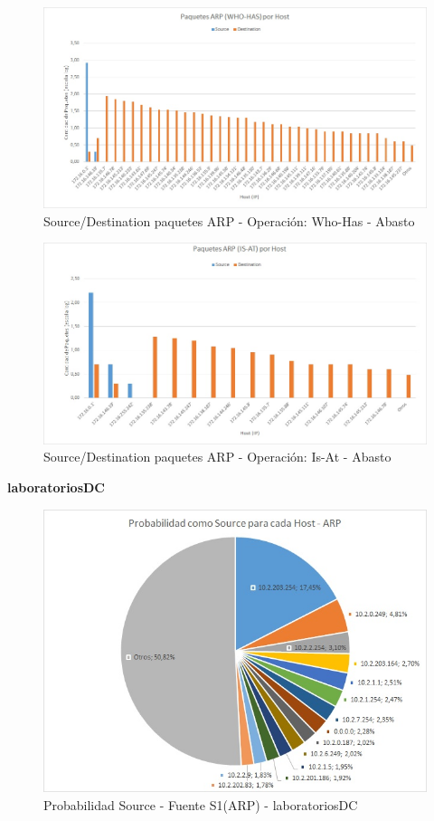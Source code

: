 

\begin{figure}[h!]
\centering
\includegraphics[scale=0.7]{./img/arp_whoHas_abasto.jpg}
\caption{Source/Destination paquetes ARP - Operación: Who-Has - Abasto}
\end{figure}

\begin{figure}[h!]
\centering
\includegraphics[scale=0.7]{./img/arp_isAt_abasto.jpg}
\caption{Source/Destination paquetes ARP - Operación: Is-At - Abasto}
\end{figure}
\newpage

\textbf{laboratoriosDC}
\begin{figure}[h!]
\centering
\includegraphics[scale=0.6]{./img/proba_src_laboDC.jpg}
\caption{Probabilidad Source - Fuente S1(ARP) - laboratoriosDC}
\end{figure}

